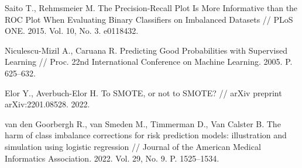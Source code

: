 \documentclass[14pt,a4paper]{extreport}
\begin{document}
\begin{enumerate}[label={[\arabic*]},ref={\arabic*},leftmargin=*,labelindent=0pt]
\item \label{ref:saito} Saito T., Rehmsmeier M. The Precision-Recall Plot Is More Informative than the ROC Plot When Evaluating Binary Classifiers on Imbalanced Datasets // PLoS ONE. 2015. Vol. 10, No. 3. e0118432.
\item \label{ref:niculescu} Niculescu-Mizil A., Caruana R. Predicting Good Probabilities with Supervised Learning // Proc. 22nd International Conference on Machine Learning. 2005. P. 625--632.
\item \label{ref:elor} Elor Y., Averbuch-Elor H. To SMOTE, or not to SMOTE? // arXiv preprint arXiv:2201.08528. 2022.
\item \label{ref:goorbergh} van den Goorbergh R., van Smeden M., Timmerman D., Van Calster B. The harm of class imbalance corrections for risk prediction models: illustration and simulation using logistic regression // Journal of the American Medical Informatics Association. 2022. Vol. 29, No. 9. P. 1525--1534.
\end{enumerate}
\end{document}
